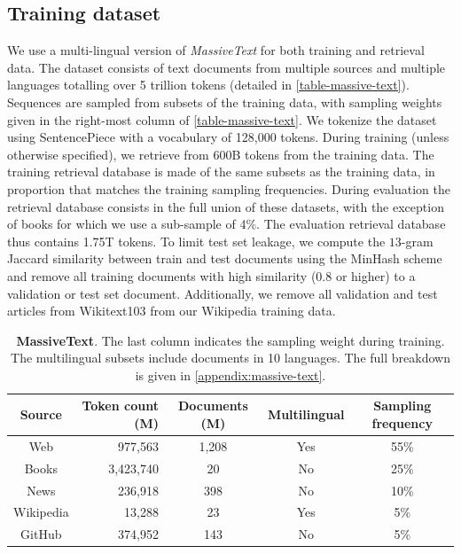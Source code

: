 \documentclass[11pt, a4paper, logo]{deepmind}
\begin{document}
\subsection{Training dataset}
\label{subsec-training-dataset}
We use a multi-lingual version of \textit{MassiveText} \citep{rae2021gopher} for both training and retrieval data.
The dataset consists of text documents from multiple sources and multiple languages totalling over 5 trillion tokens (detailed in \autoref{table-massive-text}). Sequences are sampled from subsets of the training data, with sampling weights given in the right-most column of \autoref{table-massive-text}.
We tokenize the dataset using SentencePiece \citep{kudo2018} with a vocabulary of 128,000 tokens.
During training (unless otherwise specified), we retrieve from 600B tokens from the training data. The training retrieval database is made of the same subsets as the training data, in proportion that matches the training sampling frequencies. 
During evaluation the retrieval database consists in the full union of these datasets, with the exception of books for which we use a sub-sample of 4\%.
The evaluation retrieval database thus contains 1.75T tokens.
To limit test set leakage, we compute the $13$-gram Jaccard similarity between train and test documents using the MinHash scheme and remove all training documents with high similarity (0.8 or higher) to a validation or test set document. 
Additionally, we remove all validation and test articles from Wikitext103 \citep{merity2016pointer} from our Wikipedia training data.


\begin{table}[b]
\caption{\textbf{MassiveText}. The last column indicates the sampling weight during training. The multilingual subsets include documents in 10 languages. The full breakdown is given in \autoref{appendix:massive-text}.}
\small{
\begin{center}
\begin{tabular}{c r c c c}
Source &  Token count (M) & Documents (M) & Multilingual & Sampling frequency \\ [0.5ex] 
\toprule
Web & 977,563 & 1,208 & Yes & 55\% \\
Books &  3,423,740 & 20 & No & 25\% \\
News & 236,918 & 398 & No & 10\% \\
Wikipedia & 13,288 & 23 & Yes & 5\% \\
GitHub & 374,952 & 143 & No & 5\% \\
\end{tabular}
\end{center}
}
\label{table-massive-text}
\end{table}
\end{document}
